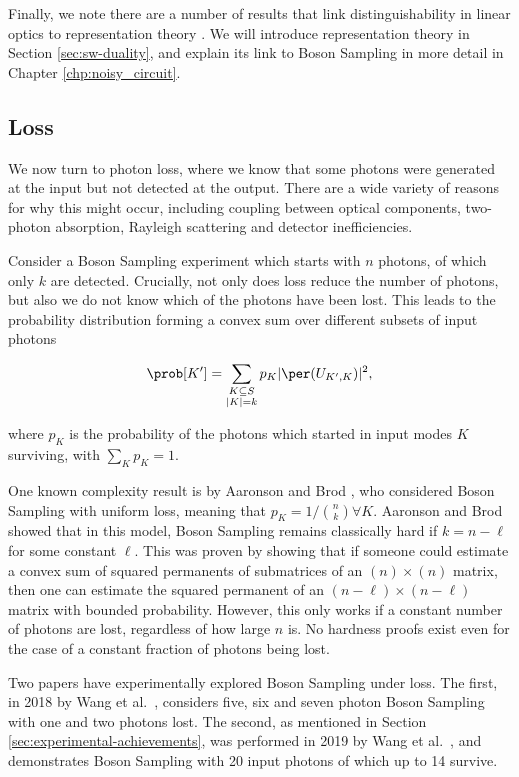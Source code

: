 Finally, we note there are a number of results that link distinguishability in linear optics to representation theory \cite{adamson2008, deguise2014, turner2016, menssen2017, stanisic2018}. We will introduce representation theory in Section \ref{sec:sw-duality}, and explain its link to Boson Sampling in more detail in Chapter \ref{chp:noisy_circuit}.

\subsection{Loss}
\label{ssec:imperfections-loss}

We now turn to photon loss, where we know that some photons were generated at the input but not detected at the output. There are a wide variety of reasons for why this might occur, including coupling between optical components, two-photon absorption, Rayleigh scattering and detector inefficiencies.

Consider a Boson Sampling experiment which starts with $n$ photons, of which only $k$ are detected. Crucially, not only does loss reduce the number of photons, but also we do not know which of the photons have been lost. This leads to the probability distribution forming a convex sum over different subsets of input photons

\begin{equation}
\prob[K'] = \sum_{\substack{K \subseteq S\\|K| = k}}p_{K}|\per(U_{K',K})|^2,
\end{equation}

\noindent where $p_K$ is the probability of the photons which started in input modes $K$ surviving, with $\sum_Kp_K = 1$.

One known complexity result is by Aaronson and Brod \cite{aaronson2016}, who considered Boson Sampling with uniform loss, meaning that $p_K=1/\binom{n}{k}\forall K$. Aaronson and Brod showed that in this model, Boson Sampling remains classically hard if $k=n-\ell$ for some constant $\ell$. This was proven by showing that if someone could estimate a convex sum of squared permanents of submatrices of an $(n)\times(n)$ matrix, then one can estimate the squared permanent of an $(n-\ell)\times(n-\ell)$ matrix with bounded probability. However, this only works if a constant number of photons are lost, regardless of how large $n$ is. No hardness proofs exist even for the case of a constant fraction of photons being lost.

Two papers have experimentally explored Boson Sampling under loss. The first, in 2018 by Wang et al.~\cite{wang2018}, considers five, six and seven photon Boson Sampling with one and two photons lost. The second, as mentioned in Section \ref{sec:experimental-achievements}, was performed in 2019 by Wang et al.~\cite{wang2019}, and demonstrates Boson Sampling with 20 input photons of which up to 14 survive.

